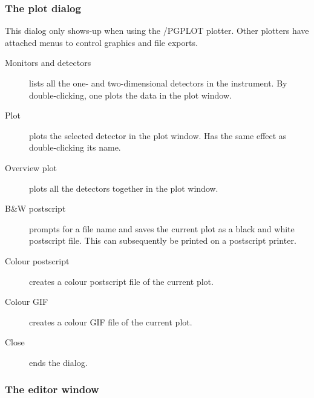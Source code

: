 \subsubsection{The plot dialog} 
This dialog only shows-up when using the \MCS/PGPLOT plotter. Other plotters have attached menus to control graphics and file exports.
\begin{description}
\item[Monitors and detectors] lists all the one- and
  two-dimensional detectors in the instrument. By double-clicking, one plots
  the data in the plot window.
\item[Plot] plots the selected detector in the plot window. Has the
  same effect as double-clicking its name.
\item[Overview plot] plots all the detectors together in the plot
  window.
\item[B\&W postscript] prompts for a file name and saves the
  current plot as a black and white postscript file. This can
  subsequently be printed on a postscript printer.
\item[Colour postscript] creates a colour postscript file of the
  current plot.
\item[Colour GIF] creates a colour GIF file of the
  current plot.
\item[Close] ends the dialog.
\end{description}


\subsubsection{The editor window}

